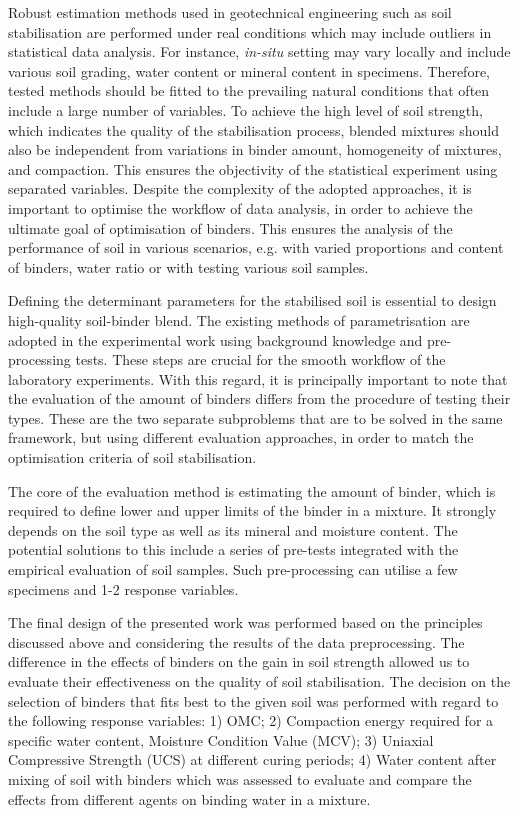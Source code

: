 \documentclass[eprint,
]{actapoly}
\begin{document}
Robust estimation methods used in geotechnical engineering such as soil stabilisation are performed under real conditions which may include outliers in statistical data analysis. For instance, \emph{in-situ} setting may vary locally and include various soil grading, water content or mineral content in specimens. Therefore, tested methods should be fitted to the prevailing natural conditions that often include a large number of variables. To achieve the high level of soil strength, which indicates the quality of the stabilisation process, blended mixtures should also be independent from variations in binder amount, homogeneity of mixtures, and compaction. This ensures the objectivity of the statistical experiment using separated variables. Despite the complexity of the adopted approaches, it is important to optimise the workflow of data analysis, in order to achieve the ultimate goal of optimisation of binders. This ensures the analysis of the performance of soil in various scenarios, e.g. with varied proportions and content of binders, water ratio or with testing various soil samples.

Defining the determinant parameters for the stabilised soil is essential to design high-quality soil-binder blend. The existing methods of parametrisation \cite{LindhNL} are adopted in the experimental work using background knowledge and pre-processing tests. These steps are crucial for the smooth workflow of the laboratory experiments. With this regard, it is principally important to note that the evaluation of the amount of binders differs from the procedure of testing their types. These are the two separate subproblems that are to be solved in the same framework, but using different evaluation approaches, in order to match the optimisation criteria of soil stabilisation. 

The core of the evaluation method is estimating the amount of binder, which is required to define lower and upper limits of the binder in a mixture. It strongly depends on the soil type as well as its mineral and moisture content. The potential solutions to this include a series of pre-tests integrated with the empirical evaluation of soil samples. Such pre-processing can utilise a few specimens and 1-2 response variables. 

The final design of the presented work was performed based on the principles discussed above and considering the results of the data preprocessing. The difference in the effects of binders on the gain in soil strength allowed us to evaluate their effectiveness on the quality of soil stabilisation. The decision on the selection of binders that fits best to the given soil was performed with regard to the following response variables: 1) OMC; 2) Compaction energy required for a specific water content, Moisture Condition Value (MCV); 3) Uniaxial Compressive Strength (UCS) at different curing periods; 4) Water content after mixing of soil with binders which was assessed to evaluate and compare the effects from different agents on binding water in a mixture.
\end{document}
